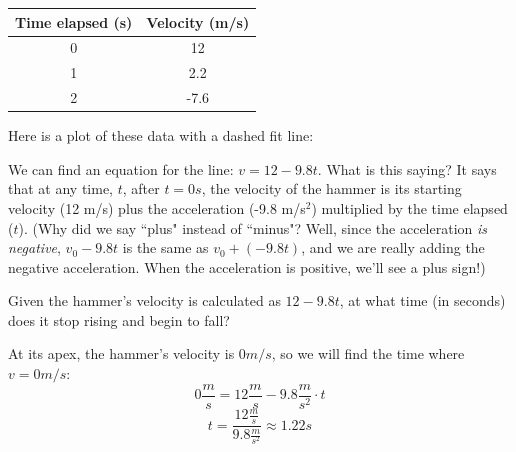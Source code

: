 \begin{center}
\begin{tabular}{|c|c|}\hline
Time elapsed (s) & Velocity (m/s)\\\hline
0 & 12\\\hline
1 & 2.2\\\hline
2 & -7.6\\\hline
\end{tabular}
\end{center}

Here is a plot of these data with a dashed fit line:
\begin{center}
\end{center}

We can find an equation for the line: $v = 12 - 9.8t$. What is this saying? It 
says that at any time, $t$, after $t=0s$, the velocity of the hammer is its 
starting velocity (12 m/s) plus the acceleration (-9.8 m/s$^2$) multiplied by 
the time elapsed ($t$). (Why did we say ``plus" instead of ``minus"? Well, 
since the acceleration \textit{is negative}, $v_0-9.8t$ is the same as $v_0 + 
\left( -9.8t \right)$, and we are really adding the negative acceleration. When 
the acceleration is positive, we'll see a plus sign!)

\begin{Exercise}[title={When is the apex of flight?}, label=vapex]
  Given the hammer's velocity is calculated as $12 - 9.8t$, at what time (in 
  seconds) does it stop rising and begin to fall?
\end{Exercise}
\begin{Answer}[ref=vapex]
  At its apex, the hammer's velocity is $0 m/s$, so we will find the time 
  where $v=0m/s$:
  $$0 \frac{m}{s} = 12 \frac{m}{s} - 9.8 \frac{m}{s^2} \cdot t$$
  $$t = \frac{12 \frac{m}{s}}{9.8 \frac{m}{s^2}} \approx 1.22s$$
\end{Answer}

